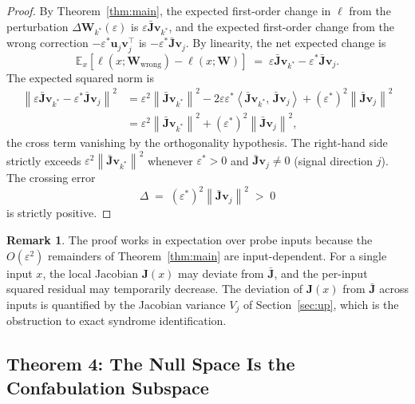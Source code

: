 \documentclass[11pt,a4paper]{article}
\theoremstyle{definition}
\newtheorem{remark}[theorem]{Remark}
\newcommand{\Wm}{\mathbf{W}}
\newcommand{\Jm}{\mathbf{J}}
\newcommand{\vk}[1][]{\mathbf{v}_{#1}}
\newcommand{\uk}[1][]{\mathbf{u}_{#1}}
\newcommand{\Eop}{\mathbb{E}}
\newcommand{\norm}[1]{\left\lVert#1\right\rVert}
\newcommand{\inner}[2]{\left\langle#1,\,#2\right\rangle}
\begin{document}
\begin{proof}
By Theorem~\ref{thm:main}, the expected first-order change in $\ell$ from the perturbation $\Delta\Wm_{k^*}(\varepsilon)$ is $\varepsilon\bar{\Jm}\vk[k^*]$, and the expected first-order change from the wrong correction $-\varepsilon^*\uk[j]\vk[j]^\top$ is $-\varepsilon^*\bar{\Jm}\vk[j]$. By linearity, the net expected change is
\[
  \Eop_x[\ell(x;\Wm_{\mathrm{wrong}}) - \ell(x;\Wm)]
  \;=\; \varepsilon\bar{\Jm}\vk[k^*] - \varepsilon^*\bar{\Jm}\vk[j].
\]
The expected squared norm is
\begin{align*}
  \norm{\varepsilon\bar{\Jm}\vk[k^*] - \varepsilon^*\bar{\Jm}\vk[j]}^2
  &= \varepsilon^2 \norm{\bar{\Jm}\vk[k^*]}^2
   - 2\varepsilon\varepsilon^* \inner{\bar{\Jm}\vk[k^*]}{\bar{\Jm}\vk[j]}
   + (\varepsilon^*)^2 \norm{\bar{\Jm}\vk[j]}^2 \\
  &= \varepsilon^2 \norm{\bar{\Jm}\vk[k^*]}^2
   + (\varepsilon^*)^2 \norm{\bar{\Jm}\vk[j]}^2,
\end{align*}
the cross term vanishing by the orthogonality hypothesis. The right-hand side strictly exceeds $\varepsilon^2 \norm{\bar{\Jm}\vk[k^*]}^2$ whenever $\varepsilon^* > 0$ and $\bar{\Jm}\vk[j] \neq 0$ (signal direction $j$). The crossing error
\[
  \Delta \;=\; (\varepsilon^*)^2\norm{\bar{\Jm}\vk[j]}^2
  \;>\; 0
\]
is strictly positive.
\end{proof}

\begin{remark}
\label{rmk:expectation}
The proof works in expectation over probe inputs because the $O(\varepsilon^2)$ remainders of Theorem~\ref{thm:main} are input-dependent. For a single input $x$, the local Jacobian $\Jm(x)$ may deviate from $\bar{\Jm}$, and the per-input squared residual may temporarily decrease. The deviation of $\Jm(x)$ from $\bar{\Jm}$ across inputs is quantified by the Jacobian variance $V_j$ of Section~\ref{sec:up}, which is the obstruction to exact syndrome identification.
\end{remark}

\subsection{Theorem 4: The Null Space Is the Confabulation Subspace}
\label{sec:null}
\end{document}
